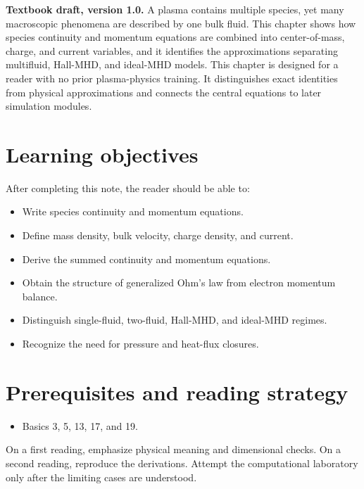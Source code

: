\documentclass[11pt]{article}
\begin{document}

\begin{overviewbox}
\textbf{Textbook draft, version 1.0.} A plasma contains multiple species, yet many macroscopic phenomena are described by one bulk fluid. This chapter shows how species continuity and momentum equations are combined into center-of-mass, charge, and current variables, and it identifies the approximations separating multifluid, Hall-MHD, and ideal-MHD models. This chapter is designed for a reader with no prior plasma-physics training. It distinguishes exact identities from physical approximations and connects the central equations to later simulation modules.
\end{overviewbox}

\ProjectTOC

\section{Learning objectives}
After completing this note, the reader should be able to:
\begin{itemize}[leftmargin=1.6em]
\item Write species continuity and momentum equations.
\item Define mass density, bulk velocity, charge density, and current.
\item Derive the summed continuity and momentum equations.
\item Obtain the structure of generalized Ohm's law from electron momentum balance.
\item Distinguish single-fluid, two-fluid, Hall-MHD, and ideal-MHD regimes.
\item Recognize the need for pressure and heat-flux closures.
\end{itemize}

\section{Prerequisites and reading strategy}
\begin{itemize}[leftmargin=1.6em]
\item Basics 3, 5, 13, 17, and 19.
\end{itemize}
On a first reading, emphasize physical meaning and dimensional checks. On a second reading, reproduce the derivations. Attempt the computational laboratory only after the limiting cases are understood.
\end{document}
